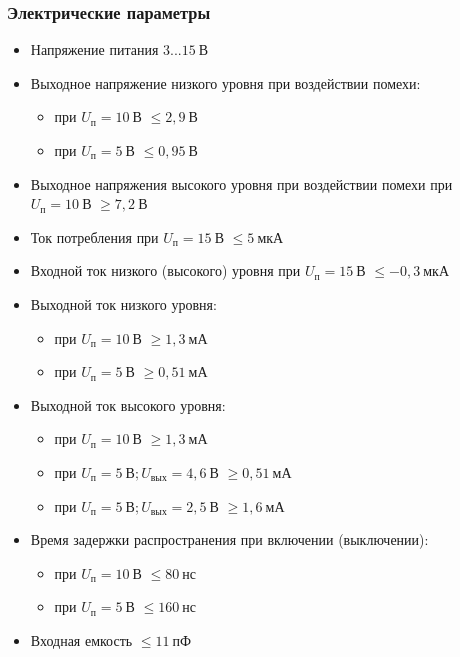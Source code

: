 \subsubsection*{Электрические параметры}
\begin{itemize}
    \item[] Напряжение питания \dotfill $3...15~\text{В}$
    \item[] Выходное напряжение низкого уровня при воздействии помехи:
    \begin{itemize}
	    \item[] при $U_{\text{п}}=10~\text{В}$ \dotfill $\leq 2,9~\text{В}$
	    \item[] при $U_{\text{п}}=5~\text{В}$ \dotfill $\leq 0,95~\text{В}$
    \end{itemize}
    \item[] Выходное напряжения высокого уровня при воздействии помехи при $U_{\text{п}}=10~\text{В}$ \dotfill $\geq 7,2~\text{В}$
    \item[] Ток потребления при $U_{\text{п}}=15~\text{В}$ \dotfill $\leq 5~\text{мкА}$
    \item[] Входной ток низкого (высокого) уровня при $U_{\text{п}}=15~\text{В}$  \dotfill $\leq -0,3~\text{мкА}$
    \item[] Выходной ток низкого уровня: 
    \begin{itemize}
	    \item[] при $U_{\text{п}}=10~\text{В}$ \dotfill $\geq 1,3~\text{мА}$ 
	    \item[] при $U_{\text{п}}=5~\text{В}$ \dotfill $\geq 0,51~\text{мА}$
    \end{itemize}
    \item[] Выходной ток высокого уровня: 
    \begin{itemize}
	    \item[] при $U_{\text{п}}=10~\text{В}$ \dotfill $\geq 1,3~\text{мА}$ 
	    \item[] при $U_{\text{п}}=5~\text{В}; U_{\text{вых}}=4,6~\text{В}$ \dotfill $\geq 0,51~\text{мА}$
	    \item[] при $U_{\text{п}}=5~\text{В}; U_{\text{вых}}=2,5~\text{В}$ \dotfill $\geq 1,6~\text{мА}$
    \end{itemize}
    \item[] Время задержки распространения при включении (выключении): 
    \begin{itemize}
	    \item[] при $U_{\text{п}}=10~\text{В}$ \dotfill $\leq 80~\text{нс}$ 
	    \item[] при $U_{\text{п}}=5~\text{В}$ \dotfill $\leq 160~\text{нс}$
    \end{itemize}
    \item[] Входная емкость \dotfill $\leq 11~\text{пФ}$
\end{itemize}
